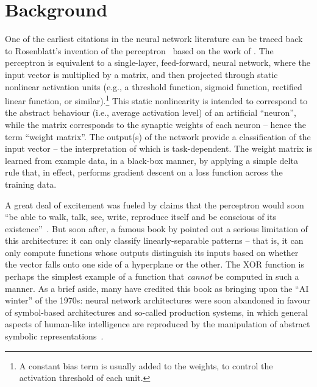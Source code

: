 \chapter{Background}
\label{chapt:background}


One of the earliest citations in the neural network literature can be traced back to Rosenblatt's invention of the perceptron~\citep{rosenblatt1958perceptron} based on the work of \citet{mcculloch1943logical}.
The perceptron is equivalent to a single-layer, feed-forward, neural network, where the input vector is multiplied by a matrix, and then projected through static nonlinear activation units (e.g., a threshold function, sigmoid function, rectified linear function, or similar).\footnote{A constant bias term is usually added to the weights, to control the activation threshold of each unit.}
This static nonlinearity is intended to correspond to the abstract behaviour (i.e., average activation level) of an artificial ``neuron'', while the matrix corresponds to the synaptic weights of each neuron -- hence the term ``weight matrix''.
The output(s) of the network provide a classification of the input vector -- the interpretation of which is task-dependent.
The weight matrix is learned from example data, in a black-box manner, by applying a simple delta rule that, in effect, performs gradient descent on a loss function across the training data.

A great deal of excitement was fueled by claims that the perceptron would soon ``be able to walk, talk, see, write, reproduce itself and be conscious of its existence''~\citep{historyofperceptrons}.
But soon after, a famous book by \citet{minsky1969perceptrons} pointed out a serious limitation of this architecture: it can only classify linearly-separable patterns -- that is, it can only compute functions whose outputs distinguish its inputs based on whether the vector falls onto one side of a hyperplane or the other.
The XOR function is perhaps the simplest example of a function that \emph{cannot} be computed in such a manner.
As a brief aside, many have credited this book as bringing upon the ``AI winter'' of the 1970s: neural network architectures were soon abandoned in favour of symbol-based architectures and so-called production systems, in which general aspects of human-like intelligence are reproduced by the manipulation of abstract symbolic representations~\citep{historyofperceptrons, newell1972human}.

